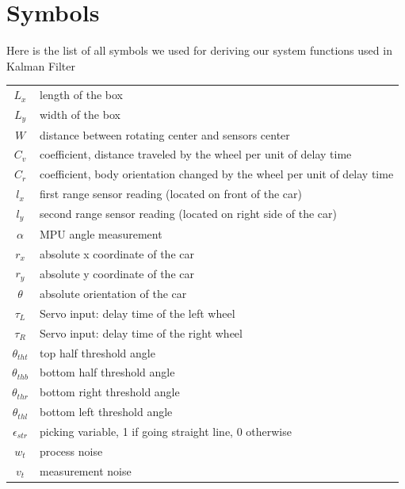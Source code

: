 \documentclass[12pt, letterpaper]{amsart} %
\numberwithin{equation}{section}
\begin{document}
\section{Symbols}
Here is the list of all symbols we used for deriving our system functions used in Kalman Filter
\\
\begin{tabular}{c p{}}
  $L_x$ & length of the box  \\
  $L_y$ & width of the box \\
  $W$ & distance between rotating center and sensors center \\
  $C_v$ & coefficient, distance traveled by the wheel per unit of delay time \\
  $C_r$ & coefficient, body orientation changed by the wheel per unit of delay time \\
  $l_x$ & first range sensor reading (located on front of the car) \\
  $l_y$ & second range sensor reading (located on right side of the car) \\
  $\alpha$ & MPU angle measurement \\
  $r_x$ & absolute x coordinate of the car \\
  $r_y$ & absolute y coordinate of the car \\
  $\theta$ & absolute orientation of the car \\
  $\tau_L$ & Servo input: delay time of the left wheel \\
  $\tau_R$ & Servo input: delay time of the right wheel \\
  $\theta_{tht}$ & top half threshold angle \\
  $\theta_{thb}$ & bottom half threshold angle \\
  $\theta_{thr}$ & bottom right threshold angle \\
  $\theta_{thl}$ & bottom left threshold angle \\
  $\epsilon_{str}$ & picking variable, 1 if going straight line, 0 otherwise \\
  $w_t$ & process noise \\
  $v_t$ & measurement noise
\end{tabular}\\
\\ \\ \\ \\ \\ \\
\end{document}
